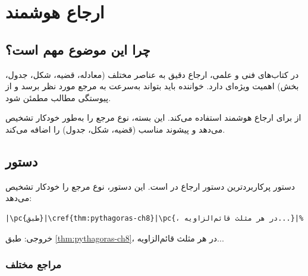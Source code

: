 
\chapter{ارجاع هوشمند}
\label{chap:cross-refs}

\section{چرا این موضوع مهم است؟}
\label{sec:cross-refs-why}

در کتاب‌های فنی و علمی، ارجاع دقیق به عناصر
مختلف (معادله، قضیه، شکل، جدول، بخش) اهمیت
ویژه‌ای دارد. خواننده باید بتواند به‌سرعت به
مرجع مورد نظر برسد و از پیوستگی مطالب مطمئن
شود.

 از  برای ارجاع
هوشمند استفاده می‌کند. این بسته، نوع مرجع را
به‌طور خودکار تشخیص می‌دهد و پیشوند مناسب
(قضیه، شکل، جدول) را اضافه می‌کند.


\section{دستور }
\label{sec:cross-refs-cref}

دستور  پرکاربردترین دستور ارجاع در
 است. این دستور، نوع مرجع را
خودکار تشخیص می‌دهد:

\begin{latin}
\begin{verbatim}
|\pc{طبق}|\cref{thm:pythagoras-ch8}|\pc{، در هر مثلث قائم‌الزاویه...}|%
\end{verbatim}
\end{latin}

خروجی: طبق \cref{thm:pythagoras-ch8}، در هر
مثلث قائم‌الزاویه...


\subsection{مراجع مختلف}
\label{sec:cross-refs-types}

